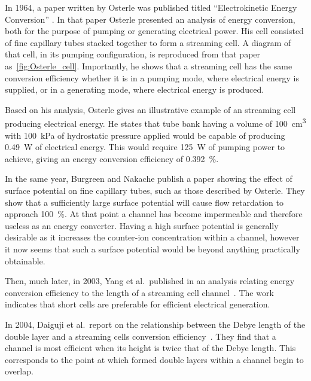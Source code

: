   In 1964, a paper written by Osterle was published titled ``Electrokinetic Energy Conversion'' \cite{Osterle1964}.
  In that paper Osterle presented an analysis of energy conversion, both for the purpose of pumping or generating electrical power.
  His cell consisted of fine capillary tubes stacked together to form a streaming cell.
  A diagram of that cell, in its pumping configuration, is reproduced from that paper as~\cref{fig:Osterle_cell}.
  Importantly, he shows that a streaming cell has the same conversion efficiency whether it is in a pumping mode, where electrical energy is supplied, or in a generating mode, where electrical energy is produced.

  Based on his analysis, Osterle gives an illustrative example of an streaming cell producing electrical energy.
  He states that tube bank having a volume of \SI{100}{\centi\meter\cubed} with \SI{100}{\kilo\pascal} of hydrostatic pressure applied would be capable of producing \SI{0.49}{\watt} of electrical energy.
  This would require \SI{125}{\watt} of pumping power to achieve, giving an energy conversion efficiency of \SI{0.392}{\percent}.

  In the same year, Burgreen and Nakache publish a paper showing the effect of surface potential on fine capillary tubes, such as those described by Osterle\cite{Burgreen1964}.
  They show that a sufficiently large surface potential will cause flow retardation to approach \SI{100}{\percent}.
  At that point a channel has become impermeable and therefore useless as an energy converter.
  Having a high surface potential is generally desirable as it increases the counter-ion concentration within a channel, however it now seems that such a surface potential would be beyond anything practically obtainable.

  Then, much later, in 2003, Yang et al.\ published in an analysis relating energy conversion efficiency to the length of a streaming cell channel~\cite{Yang2003}.
  The work indicates that short cells are preferable for efficient electrical generation.

  In 2004, Daiguji et al.\ report on the relationship between the Debye length of the double layer and a streaming cells conversion efficiency~\cite{Daiguji2004}.
  They find that a channel is most efficient when its height is twice that of the Debye length.
  This corresponds to the point at which formed double layers within a channel begin to overlap.

